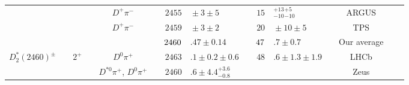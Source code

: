 \begin{adjustbox}{width=0.76\textwidth,center}
{\begin{tabular}{cp{5pt}cp{5pt}cp{5pt}r@{}lp{5pt}r@{}lp{5pt}cp{5pt}c}
		                                         &                  &                              &                  & $D^{+}\pi^{-}$                  &                       & $	2455$                       & ${}\pm3\pm5	$                                 &                       & $	15$                                            & ${}^{+13}_{-10}{}^{+5}_{-10}	$               &                       & ARGUS                                                         &                       & \cite{Albrecht:1988dj}                    \\
		                                         &                  &                              &                  & $D^{+}\pi^{-}$                  &                       & $ 2459$                       & ${}\pm3\pm2$                                  &                       & $ 20$                                            & ${}\pm10\pm5$                                &                       & TPS                                                           &                       & \cite{Anjos:1988uf}                       \\	 \cmidrule{6-14}															
		\cmidrule{6-14}												
		                                         &                  &                              &                  &                                 & \cellcolor{Gray}      & $	\cellcolor{Gray} 2460$      & \cellcolor{Gray}$.47 \pm 0.14	$               & \cellcolor{Gray}      & $	\cellcolor{Gray} 47$                           & \cellcolor{Gray}$.7 \pm 0.7	$                & \cellcolor{Gray}      & \cellcolor{Gray} Our average                                  & \cellcolor{Gray}      &                                           \\ \midrule
		\multirow{9}{*}{$D_{2}^{*}(2460)^{\pm}$} &                  & \multirow{9}{*}{$2^{+}$}     &                  & $D^{0}\pi^{+}$                  &                       & $	2463$                       & $.1\pm0.2\pm0.6	$                             &                       & $	48$                                            & $.6\pm1.3\pm1.9	$                            &                       & LHCb                                                          &                       & \cite{Aaij:2013sza}                       \\
		                                         &                  &                              &                  & $D^{*0}\pi^{+}$, $D^{0}\pi^{+}$ &                       & $	2460$                       & $.6\pm4.4^{+3.6}_{-0.8}	$                     &                       &                                                  &                                              &                       & Zeus                                                          &                       & \cite{Abramowicz:2012ys}                  \\

\end{tabular}}
\end{adjustbox}
